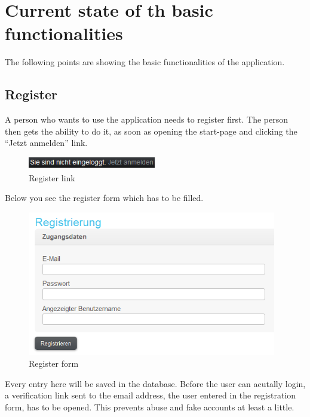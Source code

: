 \section{Current state of th basic functionalities}

The following points are showing the basic functionalities of the application.

\subsection{Register}

A person who wants to use the application needs to register first. The person then gets the ability to do it, as soon as opening the start-page and clicking the \enquote{Jetzt anmelden} link.

\begin{figure}[!ht]
  \centering
    \includegraphics[width=0.50\textwidth]{images/basic_functionalities/reg1.png}
  \caption{Register link}
  \label{fig:register link}
\end{figure}

Below you see the register form which has to be filled.

\begin{figure}[!ht]
  \centering
    \includegraphics[width=0.97\textwidth]{images/basic_functionalities/register_form.png}
  \caption{Register form}
  \label{fig:register form}
\end{figure}

Every entry here will be saved in the database. Before the user can acutally login, a verification link sent to the email address, the user entered in the registration form, has to be opened. This prevents abuse and fake accounts at least a little.

